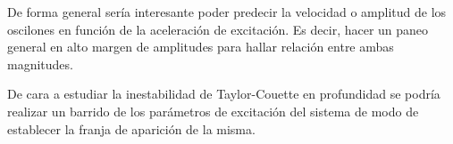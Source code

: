 \documentclass[../main.tex]{subfiles}
\begin{document}
De forma general sería interesante poder predecir la velocidad o amplitud de los oscilones en función de la aceleración de excitación. Es decir, hacer un paneo general en alto margen de amplitudes para hallar relación entre ambas magnitudes. 

De cara a estudiar la inestabilidad de Taylor-Couette en profundidad se podría realizar un barrido de los parámetros de excitación del sistema de modo de establecer la franja de aparición de la misma. 

\end{document}

